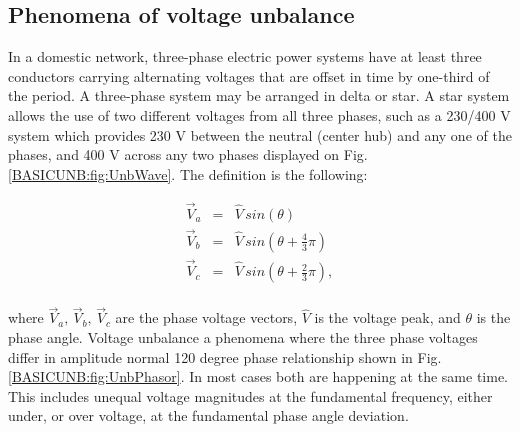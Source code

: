 \subsection{Phenomena of voltage unbalance}\label{BASICUNB:sec:PhenomenafUNB}

In a domestic network, three-phase electric power systems have at least three conductors carrying alternating voltages that are offset in time by one-third of the period. A three-phase system may be arranged in delta  or star. A star system allows the use of two different voltages from all three phases, such as a 230/400 V system which provides 230 V between the neutral (center hub) and any one of the phases, and 400 V across any two phases displayed on Fig.\ref{BASICUNB:fig:UnbWave}. The definition is the following:
	
			\begin{equation}
        \begin{array}{rcl}
            \vec{V}_a&=&\hat{V}\,sin(\theta)\\
						\vec{V}_b&=&\hat{V}\,sin(\theta+\frac{4}{3}\pi)\\
						\vec{V}_c&=&\hat{V}\,sin(\theta+\frac{2}{3}\pi),\\
        \end{array}
        \label{BASICUNB:equ:Definition}
    \end{equation}
	
	where $\vec{V}_a,\,\vec{V}_b,\,\vec{V}_c$ are the phase voltage vectors, $\hat{V}$ is the voltage peak, and $\theta$ is the phase angle. Voltage unbalance a phenomena where the three phase voltages differ in amplitude normal 120 degree phase relationship shown in Fig.\ref{BASICUNB:fig:UnbPhasor}. In most cases both are happening at the same time. This includes unequal voltage magnitudes at the fundamental frequency, either under, or over voltage, at the fundamental phase angle deviation.
	
